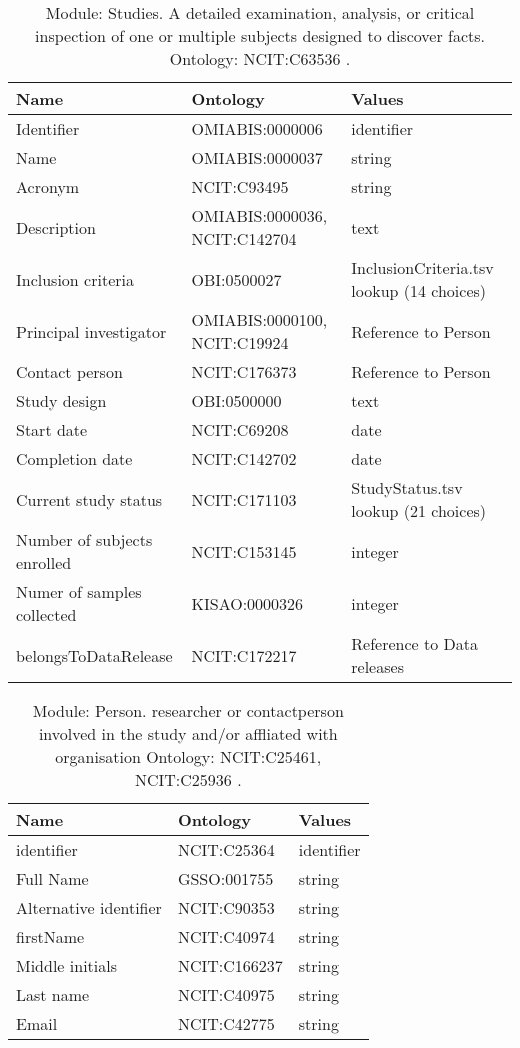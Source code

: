\documentclass{article}
\begin{document}
\begin{table}[htb]
\begin{tabular}{lll}
Name & Ontology & Values \\
\hline
Identifier & OMIABIS:0000006  & identifier \\
Name & OMIABIS:0000037  & string \\
Acronym & NCIT:C93495  & string \\
Description & OMIABIS:0000036, NCIT:C142704  & text \\
Inclusion criteria & OBI:0500027  & InclusionCriteria.tsv lookup (14 choices) \\
Principal investigator & OMIABIS:0000100, NCIT:C19924  & Reference to Person \\
Contact person & NCIT:C176373  & Reference to Person \\
Study design & OBI:0500000  & text \\
Start date & NCIT:C69208  & date \\
Completion date & NCIT:C142702  & date \\
Current study status & NCIT:C171103  & StudyStatus.tsv lookup (21 choices) \\
Number of subjects enrolled & NCIT:C153145  & integer \\
Numer of samples collected & KISAO:0000326  & integer \\
belongsToDataRelease & NCIT:C172217  & Reference to Data releases \\
\hline
\end{tabular}
\caption[Module: Studies]{\label{table:table2} Module: Studies. A detailed examination, analysis, or critical inspection of one or multiple subjects designed to discover facts. Ontology: NCIT:C63536 . }
\end{table}

\begin{table}[htb]
\begin{tabular}{lll}
Name & Ontology & Values \\
\hline
identifier & NCIT:C25364  & identifier \\
Full Name & GSSO:001755  & string \\
Alternative identifier & NCIT:C90353  & string \\
firstName & NCIT:C40974  & string \\
Middle initials & NCIT:C166237  & string \\
Last name & NCIT:C40975  & string \\
Email & NCIT:C42775  & string \\
\hline
\end{tabular}
\caption[Module: Person]{\label{table:table3} Module: Person. researcher or contactperson involved in the study and/or affliated with organisation Ontology: NCIT:C25461, NCIT:C25936 . }
\end{table}
\end{document}
